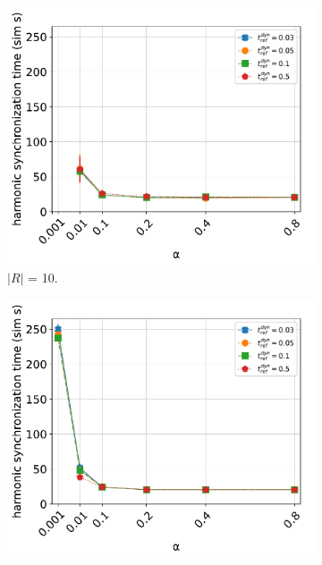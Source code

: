 \begin{figure}[ht!]
\begin{subfigure}[b]{0.5\textwidth}
			\includegraphics[width=\textwidth]{Assets/DocSegments/Chapters/ExperimentsAndResults/Figures/PerfScores/t_ref_dyn_x_alpha_hyperparamtuning_experiment_plot_collsize10.pdf}
			\caption{$|R|$ = 10.}
			\label{fig:sub:t_ref_dyn_x_alpha_collsize10}
		  \end{subfigure}
		  \begin{subfigure}[b]{0.5\textwidth}
			\centering\captionsetup{width=.9\linewidth}%
			\includegraphics[width=\textwidth]{Assets/DocSegments/Chapters/ExperimentsAndResults/Figures/PerfScores/t_ref_dyn_x_alpha_hyperparamtuning_experiment_plot_collsize25.pdf}

\end{subfigure}
\end{figure}
